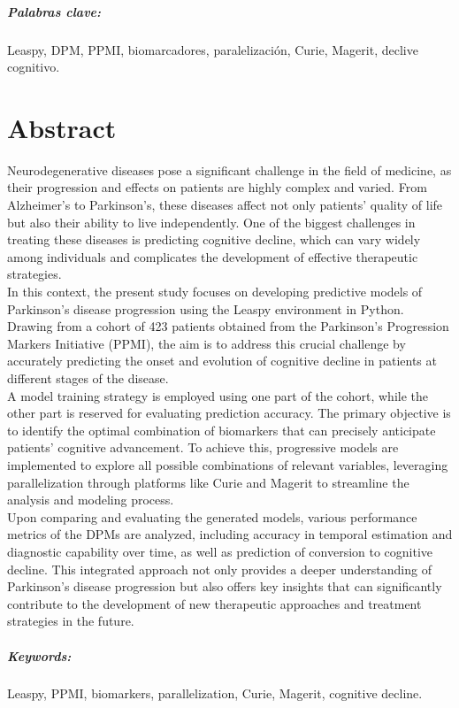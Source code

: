 \paragraph{Palabras clave:} Leaspy, DPM, PPMI, biomarcadores, paralelización, Curie, Magerit, declive cognitivo.

\chapter{Abstract}

Neurodegenerative diseases pose a significant challenge in the field of medicine, as their progression and effects on patients are highly complex and varied. From Alzheimer's to Parkinson's, these diseases affect not only patients' quality of life but also their ability to live independently. One of the biggest challenges in treating these diseases is predicting cognitive decline, which can vary widely among individuals and complicates the development of effective therapeutic strategies.\\

In this context, the present study focuses on developing predictive models of Parkinson's disease progression using the Leaspy environment in Python. Drawing from a cohort of 423 patients obtained from the Parkinson's Progression Markers Initiative (PPMI), the aim is to address this crucial challenge by accurately predicting the onset and evolution of cognitive decline in patients at different stages of the disease.\\

A model training strategy is employed using one part of the cohort, while the other part is reserved for evaluating prediction accuracy. The primary objective is to identify the optimal combination of biomarkers that can precisely anticipate patients' cognitive advancement. To achieve this, progressive models are implemented to explore all possible combinations of relevant variables, leveraging parallelization through platforms like Curie and Magerit to streamline the analysis and modeling process.\\

Upon comparing and evaluating the generated models, various performance metrics of the DPMs are analyzed, including accuracy in temporal estimation and diagnostic capability over time, as well as prediction of conversion to cognitive decline. This integrated approach not only provides a deeper understanding of Parkinson's disease progression but also offers key insights that can significantly contribute to the development of new therapeutic approaches and treatment strategies in the future.

\paragraph{Keywords:} Leaspy, PPMI, biomarkers, parallelization, Curie, Magerit, cognitive decline.